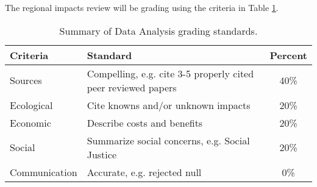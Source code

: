 The regional impacts review will be grading using the criteria in Table \ref{tab:regionalimpactsgrading}.

\begin{table}[h]
\caption{Summary of Data Analysis grading standards.}
\label{tab:regionalimpactsgrading}
\begin{tabular}{llc}\hline
Criteria            &   Standard    & Percent \\ \hline\hline
Sources     & Compelling, e.g. cite {\color{red}3-}5 properly cited peer reviewed papers & 40\% \\
Ecological  & Cite knowns and/or unknown impacts            & 20\% \\
Economic    & Describe costs and benefits              & 20\% \\
Social      & Summarize social concerns, e.g. Social Justice             & 20\% \\
Communication    & Accurate, e.g. rejected null   & {\color{red}0\%} \\

\hline
\end{tabular}
\end{table}
